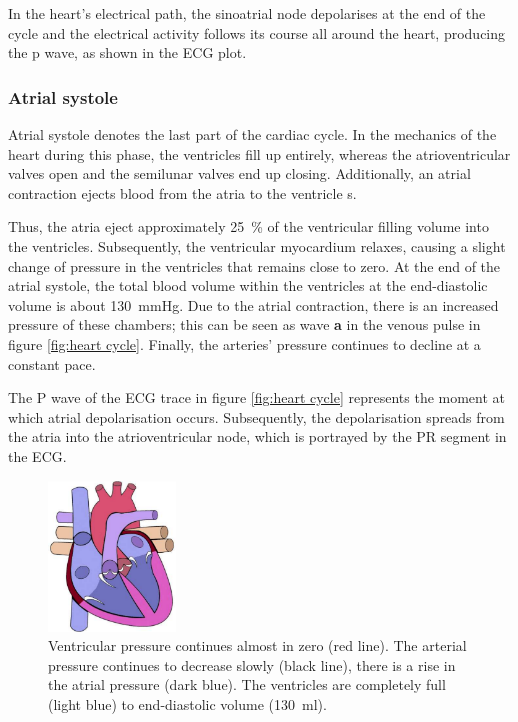 In the heart's electrical path, the sinoatrial node depolarises at the end of the cycle and the electrical activity follows its course all around the heart, producing the p wave, as shown in the ECG plot. 

\subsubsection{Atrial systole}
Atrial systole denotes the last part of the cardiac cycle. In the mechanics of the heart during this phase, the ventricles fill up entirely, whereas the atrioventricular valves open and the semilunar valves end up closing. Additionally, an atrial contraction ejects blood from the atria to the ventricle \cite{Hall:2015aa}s. 

Thus, the atria eject approximately \SI{25}{\percent} of the ventricular filling volume into the ventricles. Subsequently, the ventricular myocardium relaxes, causing a slight change of pressure in the ventricles that remains close to zero. At the end of the atrial systole, the total blood volume within the ventricles at the end-diastolic volume is about \SI{130}{\mmHg}. Due to the atrial contraction, there is an increased pressure of these chambers; this can be seen as wave \textbf{a} in the venous pulse in figure \ref{fig:heart cycle}. Finally, the arteries' pressure continues to decline at a constant pace.

The P wave of the ECG trace in figure \ref{fig:heart cycle} represents the moment at which atrial depolarisation occurs. Subsequently, the depolarisation spreads from the atria into the atrioventricular node, which is portrayed by the PR segment in the ECG.

\begin{figure}[!htpb]
	\centering
	\includegraphics[height=4cm,keepaspectratio]{figure_17}
	\caption[Heart's chambers movement during Atrial systole]{Ventricular pressure continues almost in zero (red line). The arterial pressure continues to decrease slowly (black line), there is a rise in the atrial pressure (dark blue). The ventricles are completely full (light blue) to end-diastolic volume (\SI{130}{\milli\litre}).}
	\label{fig:heart atrial systole}
\end{figure}


